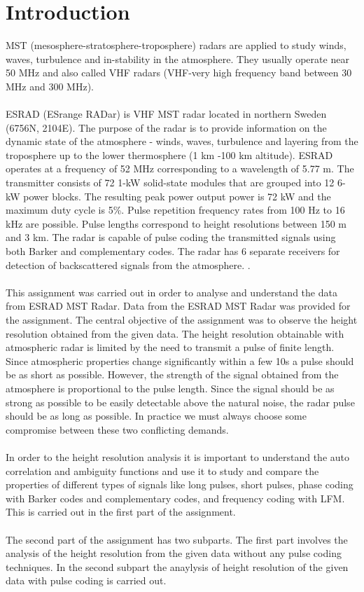 \documentclass{article}
\begin{document}
\section{Introduction}
MST (mesosphere-stratosphere-troposphere) radars are applied to study winds, waves, turbulence and in-stability in the atmosphere. They usually operate near 50 MHz and also called VHF radars (VHF-very high frequency band between 30 MHz and 300 MHz).\\
\\
ESRAD (ESrange RADar) is VHF MST radar located in northern Sweden (6756N, 2104E). The purpose of the radar is to provide information on the dynamic state of the atmosphere - winds, waves, turbulence and layering from the troposphere up to the lower thermosphere (1 km -100 km altitude). ESRAD operates at a frequency of 52 MHz corresponding to a wavelength of 5.77 m. The transmitter consists of 72 1-kW solid-state modules that are grouped into 12 6-kW power blocks. The resulting peak power output power is 72 kW and the maximum duty cycle is 5\%. Pulse repetition frequency rates from 100 Hz to 16 kHz are possible. Pulse lengths correspond to height resolutions between 150 m and 3 km. The radar is capable of pulse coding the transmitted signals using both Barker and complementary codes. The radar has 6 separate receivers for detection of backscattered signals from the atmosphere. \cite{Enmark:2012a2}.\\
\\
This assignment was carried out in order to analyse and understand the data from ESRAD MST Radar. Data from the ESRAD MST Radar was provided for the assignment. The central objective of the assignment was to observe the height resolution obtained from the given data. The height resolution obtainable with atmospheric radar is limited by the need to transmit a pulse of finite length. Since atmospheric properties change significantly within a few 10s a pulse should be as short as possible. However, the strength of the signal obtained from the atmosphere is proportional to the pulse length. Since the signal should be as strong as possible to be easily detectable above the natural noise, the radar pulse should be as long as possible. In practice we must always choose some compromise between these two conflicting demands.\\
\\
In order to the height resolution analysis it is important to understand the auto correlation and ambiguity functions and use it to study and compare the properties of different types of signals like long pulses, short pulses, phase coding with Barker codes and complementary codes, and frequency coding with LFM. This is carried out in the first part of the assignment.\\
\\
The second part of the assignment has two subparts. The first part involves the analysis of the height resolution from the given data without any pulse coding techniques. In the second subpart the anaylysis of height resolution of the given data with pulse coding is carried out. 
 
\end{document}
